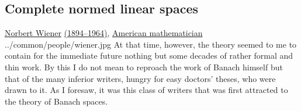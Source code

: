 



\subsection{Complete normed linear spaces}
\label{sec:vsBanach}


\qboxnpq
  {\href{http://en.wikipedia.org/wiki/Norbert_Wiener}{Norbert Wiener}
   \href{http://www-history.mcs.st-andrews.ac.uk/Timelines/TimelineG.html}{(1894--1964)}, 
   \href{http://www-history.mcs.st-andrews.ac.uk/BirthplaceMaps/Places/USA.html}{American mathematician}
    \footnotemark
  }
  {../common/people/wiener.jpg}
  {At that time, however, the theory seemed to me to contain for the immediate future
   nothing but some decades of rather formal and thin work.
   By this I do not mean to reproach the work of Banach himself
   but that of the many inferior writers, hungry for easy doctors' theses,
   who were drawn to it.
   As I foresaw, it was this class of writers that was first attracted 
   to the theory of Banach spaces.}




